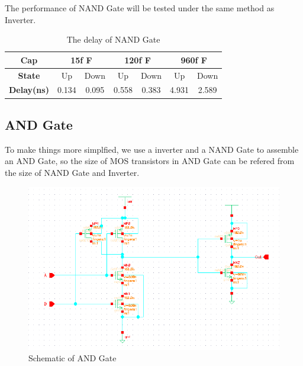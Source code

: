 \documentclass[conference]{IEEEtran}
\begin{document}
The performance of NAND Gate will be tested under the same method as Inverter.

\begin{table}[h]
    \caption{The delay of NAND Gate}
    \begin{center}
        \begin{tabular}{|c|c|c|c|c|c|c|}
            \hline
            \textbf{Cap} & \multicolumn{2}{|c|}{15f F} & \multicolumn{2}{|c|}{120f F} & \multicolumn{2}{|c|}{960f F} \\
            \hline
            \textbf{State} & Up & Down & Up & Down & Up & Down \\
            \hline
            
            \textbf{Delay(ns)} & 0.134 & 0.095 & 0.558 & 0.383 & 4.931 & 2.589 \\
            \hline
        \end{tabular}
    \end{center}
    \label{The delay of NAND}
\end{table}

\subsection{AND Gate}

To make things more simplfied, we use a inverter and a NAND Gate to assemble an AND Gate, so the size of MOS transistors in AND Gate can be refered from the size of NAND Gate and Inverter.

\begin{figure}[H]
    \centering
    \includegraphics[width = 0.9\linewidth]{and2_schematic.png}
    \caption{Schematic of AND Gate}
    \label{Schematic of AND Gate}
\end{figure}
\end{document}
